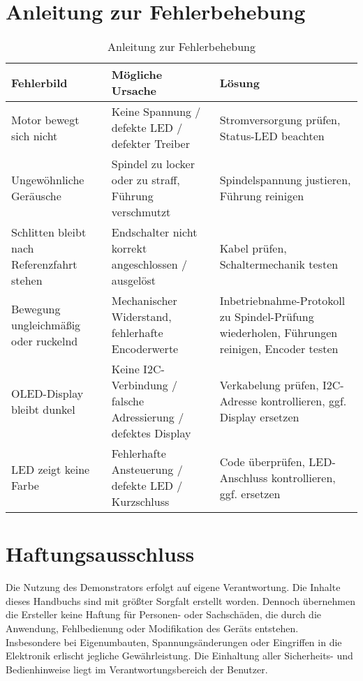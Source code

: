\documentclass[a4paper,12pt]{report}
\begin{document}
	
	\chapter{Anleitung zur Fehlerbehebung}
	\begin{table}[h]
		\centering
		\begin{tabular}{|p{4cm}|p{5cm}|p{4cm}|}
			\hline
			\textbf{Fehlerbild} & \textbf{Mögliche Ursache} & \textbf{Lösung} \\ \hline
			Motor bewegt sich nicht & Keine Spannung / defekte LED / defekter Treiber & Stromversorgung prüfen, Status-LED beachten \\ \hline
			Ungewöhnliche Geräusche & Spindel zu locker oder zu straff, Führung verschmutzt & Spindelspannung justieren, Führung reinigen \\ \hline
			Schlitten bleibt nach Referenzfahrt stehen & Endschalter nicht korrekt angeschlossen / ausgelöst & Kabel prüfen, Schaltermechanik testen \\ \hline
			Bewegung ungleichmäßig oder ruckelnd & Mechanischer Widerstand, fehlerhafte Encoderwerte & Inbetriebnahme-Protokoll zu Spindel-Prüfung wiederholen, Führungen reinigen, Encoder testen \\ \hline
			OLED-Display bleibt dunkel & Keine I2C-Verbindung / falsche Adressierung / defektes Display & Verkabelung prüfen, I2C-Adresse kontrollieren, ggf. Display ersetzen \\ \hline
			LED zeigt keine Farbe & Fehlerhafte Ansteuerung / defekte LED / Kurzschluss & Code überprüfen, LED-Anschluss kontrollieren, ggf. ersetzen \\ \hline
		\end{tabular}
		\caption{Anleitung zur Fehlerbehebung}
		\label{tab:fehlerbehebung}
	\end{table}
	
	
	\chapter{Haftungsausschluss}
	\begin{itemize}[leftmargin=1.5em]
		Die Nutzung des Demonstrators erfolgt auf eigene Verantwortung. Die Inhalte dieses Handbuchs sind mit größter Sorgfalt erstellt worden. Dennoch übernehmen die Ersteller keine Haftung für Personen- oder Sachschäden, die durch die Anwendung, Fehlbedienung oder Modifikation des Geräts entstehen. \\
		
		Insbesondere bei Eigenumbauten, Spannungsänderungen oder Eingriffen in die Elektronik erlischt jegliche Gewährleistung. Die Einhaltung aller Sicherheits- und Bedienhinweise liegt im Verantwortungsbereich der Benutzer. 
	\end{itemize}
	
\end{document}
